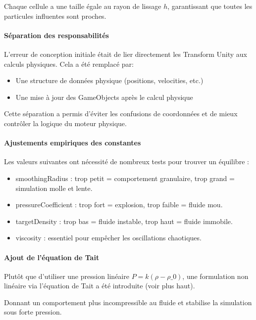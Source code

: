 \documentclass{article}
\begin{document}
Chaque cellule a une taille égale au rayon de lissage \(h\), garantissant que toutes les particules influentes sont proches.

\paragraph{Séparation des responsabilités}

L’erreur de conception initiale était de lier directement les Transform Unity aux calculs physiques. Cela a été remplacé par:

\begin{itemize}
    \item Une structure de données physique (positions, velocities, etc.)
    \item Une mise à jour des GameObjects après le calcul physique
\end{itemize}

Cette séparation a permis d'éviter les confusions de coordonnées et de mieux contrôler la logique du moteur physique.

\paragraph{Ajustements empiriques des constantes}

Les valeurs suivantes ont nécessité de nombreux tests pour trouver un équilibre :

\begin{itemize}
    \item smoothingRadius : trop petit = comportement granulaire, trop grand = simulation molle et lente.
    \item pressureCoefficient : trop fort = explosion, trop faible = fluide mou.
    \item targetDensity : trop bas = fluide instable, trop haut = fluide immobile.
    \item viscosity : essentiel pour empêcher les oscillations chaotiques.
\end{itemize}

\paragraph{Ajout de l'équation de Tait}

Plutôt que d’utiliser une pression linéaire \(P = k(ρ - ρ\_0)\), une formulation non linéaire via l’équation de Tait a été introduite (voir plus haut).

Donnant un comportement plus incompressible au fluide et stabilise la simulation sous forte pression.
\end{document}
